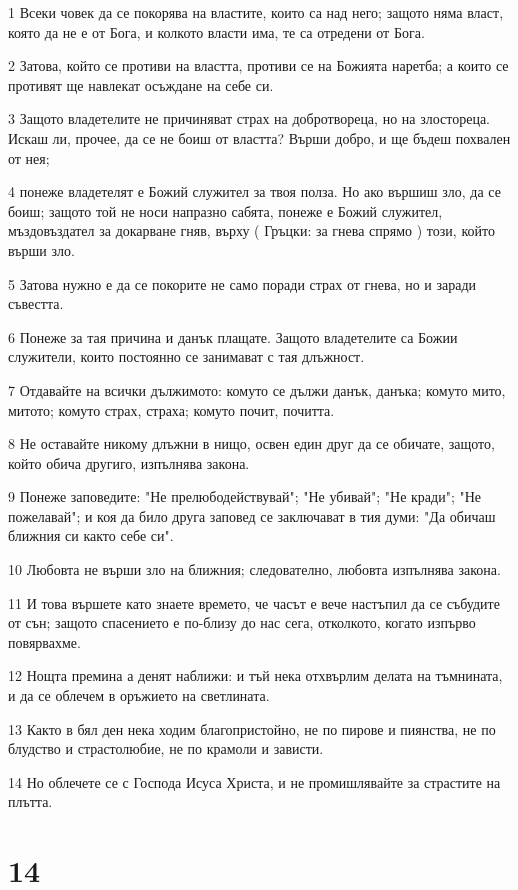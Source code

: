 \par 1 Всеки човек да се покорява на властите, които са над него; защото няма власт, която да не е от Бога, и колкото власти има, те са отредени от Бога.
\par 2 Затова, който се противи на властта, противи се на Божията наретба; а които се противят ще навлекат осъждане на себе си.
\par 3 Защото владетелите не причиняват страх на добротвореца, но на злостореца. Искаш ли, прочее, да се не боиш от властта? Върши добро, и ще бъдеш похвален от нея;
\par 4 понеже владетелят е Божий служител за твоя полза. Но ако вършиш зло, да се боиш; защото той не носи напразно сабята, понеже е Божий служител, мъздовъздател за докарване гняв, върху ( Гръцки: за гнева спрямо ) този, който върши зло.
\par 5 Затова нужно е да се покорите не само поради страх от гнева, но и заради съвестта.
\par 6 Понеже за тая причина и данък плащате. Защото владетелите са Божии служители, които постоянно се занимават с тая длъжност.
\par 7 Отдавайте на всички дължимото: комуто се дължи данък, данъка; комуто мито, митото; комуто страх, страха; комуто почит, почитта.
\par 8 Не оставайте никому длъжни в нищо, освен един друг да се обичате, защото, който обича другиго, изпълнява закона.
\par 9 Понеже заповедите: "Не прелюбодействувай"; "Не убивай"; "Не кради"; "Не пожелавай"; и коя да било друга заповед се заключават в тия думи: "Да обичаш ближния си както себе си".
\par 10 Любовта не върши зло на ближния; следователно, любовта изпълнява закона.
\par 11 И това вършете като знаете времето, че часът е вече настъпил да се събудите от сън; защото спасението е по-близу до нас сега, отколкото, когато изпърво повярвахме.
\par 12 Нощта премина а денят наближи: и тъй нека отхвърлим делата на тъмнината, и да се облечем в оръжието на светлината.
\par 13 Както в бял ден нека ходим благопристойно, не по пирове и пиянства, не по блудство и страстолюбие, не по крамоли и зависти.
\par 14 Но облечете се с Господа Исуса Христа, и не промишлявайте за страстите на плътта.

\chapter{14}

